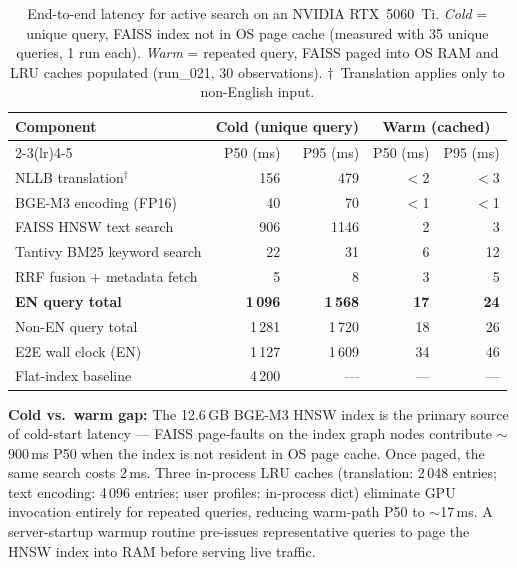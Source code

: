 \begin{table}[H]
\caption{End-to-end latency for active search on an NVIDIA RTX~5060~Ti.
         \emph{Cold} = unique query, FAISS index not in OS page cache
         (measured with 35 unique queries, 1 run each).
         \emph{Warm} = repeated query, FAISS paged into OS RAM and
         LRU caches populated (run\_021, 30 observations).
         $\dagger$~Translation applies only to non-English input.}
\label{tab:latency}
\centering
\begin{tabular}{lrrrr}
\toprule
\multirow{2}{*}{\textbf{Component}}
  & \multicolumn{2}{c}{\textbf{Cold (unique query)}}
  & \multicolumn{2}{c}{\textbf{Warm (cached)}} \\
\cmidrule(lr){2-3}\cmidrule(lr){4-5}
  & P50 (ms) & P95 (ms) & P50 (ms) & P95 (ms) \\
\midrule
NLLB translation$^\dagger$  & 156  & 479  & $<$2   & $<$3  \\
BGE-M3 encoding (FP16)      & 40   & 70   & $<$1   & $<$1  \\
FAISS HNSW text search      & 906  & 1146 & 2      & 3     \\
Tantivy BM25 keyword search & 22   & 31   & 6      & 12    \\
RRF fusion + metadata fetch & 5    & 8    & 3      & 5     \\
\midrule
\textbf{EN query total}     & \textbf{1\,096} & \textbf{1\,568} & \textbf{17} & \textbf{24} \\
Non-EN query total          & 1\,281          & 1\,720          & 18          & 26          \\
\midrule
E2E wall clock (EN)         & 1\,127          & 1\,609          & 34          & 46          \\
\midrule
Flat-index baseline         & 4\,200          & ---             & ---         & ---         \\
\bottomrule
\end{tabular}
\smallskip

\noindent\footnotesize
\textbf{Cold vs.\ warm gap:} The 12.6\,GB BGE-M3 HNSW index is the primary
source of cold-start latency — FAISS page-faults on the index graph nodes
contribute $\sim$900\,ms P50 when the index is not resident in OS page cache.
Once paged, the same search costs 2\,ms.
Three in-process LRU caches (translation: 2\,048 entries; text encoding:
4\,096 entries; user profiles: in-process dict) eliminate GPU invocation
entirely for repeated queries, reducing warm-path P50 to $\sim$17\,ms.
A server-startup warmup routine pre-issues representative queries to page
the HNSW index into RAM before serving live traffic.
\end{table}
